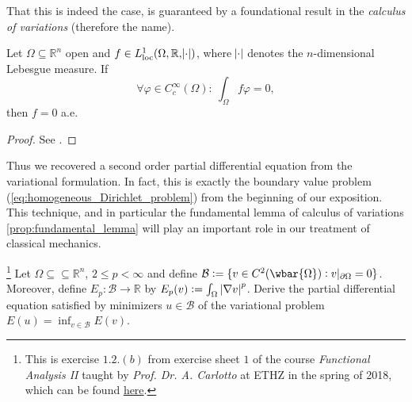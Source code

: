 That this is indeed the case, is guaranteed by a foundational result in the \emph{calculus of variations} (therefore the name).

\begin{proposition}
	\label{prop:fundamental_lemma}
	Let $\Omega \subseteq \mathbb{R}^n$ open and $f \in L^1_{\mathrm{loc}}(\Omega,\mathbb{R},\abs{\cdot})$, where $\abs{\cdot}$ denotes the $n$-dimensional Lebesgue measure. If
	\begin{equation*}
		\forall \varphi \in C^\infty_c(\Omega): \> \int_\Omega f\varphi = 0,
	\end{equation*}
	\noindent then $f = 0$ a.e.
\end{proposition}

\begin{proof}
	See \cite[40]{struwe:fa:2014}.
\end{proof}

Thus we recovered a second order partial differential equation from the variational formulation. In fact, this is exactly the boundary value problem (\ref{eq:homogeneous_Dirichlet_problem}) from the beginning of our exposition. This technique, and in particular the fundamental lemma of calculus of variations \ref{prop:fundamental_lemma} will play an important role in our treatment of classical mechanics.

\begin{exercise}\footnote{This is exercise $1.2. (b)$ from exercise sheet $1$ of the course \emph{Functional Analysis II} taught by \emph{Prof. Dr. A. Carlotto} at ETHZ in the spring of 2018, which can be found \href{https://metaphor.ethz.ch/x/2018/fs/401-3462-00L/ex/Problems01-FAII.pdf}{here}.}
	Let $\Omega \subseteq \subseteq \mathbb{R}^n$, $2 \leq p < \infty$ and define $\mathcal{B} := \cbr[0]{v \in C^2(\wbar{\Omega}) : v\vert_{\partial\Omega} = 0}$. Moreover, define $E_p : \mathcal{B} \to \mathbb{R}$ by $E_p(v) := \int_\Omega \abs[0]{\nabla v}^p$. Derive the partial differential equation satisfied by minimizers $u \in \mathcal{B}$ of the variational problem $E(u) = \inf_{v \in \mathcal{B}}E(v)$.	
\end{exercise}
